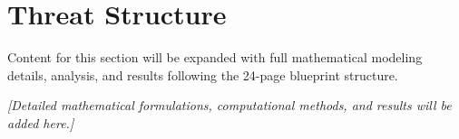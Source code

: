 \section{Threat Structure}

Content for this section will be expanded with full mathematical modeling details, analysis, and results following the 24-page blueprint structure.

\vspace{0.5cm}

\noindent \textit{[Detailed mathematical formulations, computational methods, and results will be added here.]}
